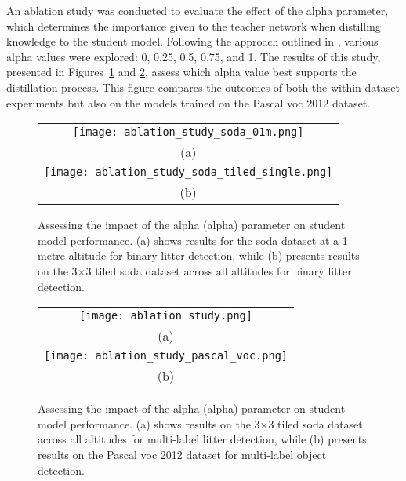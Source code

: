 
An ablation study was conducted to evaluate the effect of the \gls{alpha} parameter, which determines the importance given to the teacher network when distilling knowledge to the student model. Following the approach outlined in \cite{lab2wild}, various \gls{alpha} values were explored: 0, 0.25, 0.5, 0.75, and 1. The results of this study, presented in Figures~\ref{fig:ablation_combined} and \ref{fig:ablation_combined2}, assess which \gls{alpha} value best supports the distillation process. This figure compares the outcomes of both the within-dataset experiments but also on the models trained on the Pascal \gls{voc} 2012 dataset.

\begin{figure}[!ht]
    \centering
    \begin{tabular}{c}
        \texttt{[image: ablation\_study\_soda\_01m.png]} \\
        \small (a) \\
        \addlinespace[1em]
        \texttt{[image: ablation\_study\_soda\_tiled\_single.png]} \\
        \small (b) \\
    \end{tabular}
    \caption{Assessing the impact of the alpha (\gls{alpha}) parameter on student model performance. 
    (a) shows results for the \gls{soda} dataset at a 1-metre altitude for binary litter detection, while 
    (b) presents results on the 3$\times$3 tiled \gls{soda} dataset across all altitudes for binary litter detection.}
    \label{fig:ablation_combined}
\end{figure}

\begin{figure}[!ht]
    \centering
    \begin{tabular}{c}
        \texttt{[image: ablation\_study.png]} \\
        \small (a) \\
        \addlinespace[1em]
        \texttt{[image: ablation\_study\_pascal\_voc.png]} \\
        \small (b) \\
    \end{tabular}
    \caption{Assessing the impact of the alpha (\gls{alpha}) parameter on student model performance. 
    (a) shows results on the 3$\times$3 tiled \gls{soda} dataset across all altitudes for multi-label litter detection, while 
    (b) presents results on the Pascal \gls{voc} 2012 dataset for multi-label object detection.}
    \label{fig:ablation_combined2}
\end{figure}

